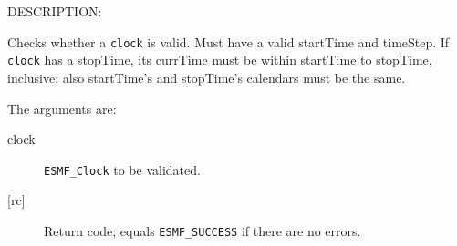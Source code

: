 {\sf DESCRIPTION:\\ }


       Checks whether a {\tt clock} is valid.
       Must have a valid startTime and timeStep.  If {\tt clock} has a
       stopTime, its currTime must be within startTime to stopTime, inclusive;
       also startTime's and stopTime's calendars must be the same.
  
       The arguments are:
       \begin{description}
       \item[clock]
            {\tt ESMF\_Clock} to be validated.
       \item[{[rc]}]
            Return code; equals {\tt ESMF\_SUCCESS} if there are no errors.
       \end{description}
  
\setlength{\parskip}{\oldparskip}
\setlength{\parindent}{\oldparindent}
\setlength{\baselineskip}{\oldbaselineskip}
